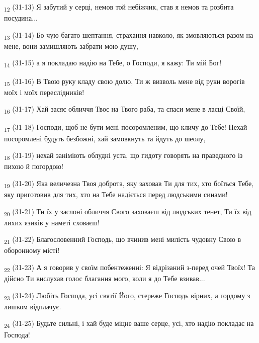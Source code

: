 \begin{tcolorbox}
\textsubscript{12} (31-13) Я забутий у серці, немов той небіжчик, став я немов та розбита посудина...
\end{tcolorbox}
\begin{tcolorbox}
\textsubscript{13} (31-14) Бо чую багато шептання, страхання навколо, як змовляються разом на мене, вони замишляють забрати мою душу,
\end{tcolorbox}
\begin{tcolorbox}
\textsubscript{14} (31-15) а я покладаю надію на Тебе, о Господи, я кажу: Ти мій Бог!
\end{tcolorbox}
\begin{tcolorbox}
\textsubscript{15} (31-16) В Твою руку кладу свою долю, Ти ж визволь мене від руки ворогів моїх і моїх переслідників!
\end{tcolorbox}
\begin{tcolorbox}
\textsubscript{16} (31-17) Хай засяє обличчя Твоє на Твого раба, та спаси мене в ласці Своїй,
\end{tcolorbox}
\begin{tcolorbox}
\textsubscript{17} (31-18) Господи, щоб не бути мені посоромленим, що кличу до Тебе! Нехай посоромлені будуть безбожні, хай замовкнуть та йдуть до шеолу,
\end{tcolorbox}
\begin{tcolorbox}
\textsubscript{18} (31-19) нехай заніміють облудні уста, що гидоту говорять на праведного із пихою й погордою!
\end{tcolorbox}
\begin{tcolorbox}
\textsubscript{19} (31-20) Яка величезна Твоя доброта, яку заховав Ти для тих, хто боїться Тебе, яку приготовив для тих, хто на Тебе надіється перед людськими синами!
\end{tcolorbox}
\begin{tcolorbox}
\textsubscript{20} (31-21) Ти їх у заслоні обличчя Свого заховаєш від людських тенет, Ти їх від лихих язиків у наметі сховаєш!
\end{tcolorbox}
\begin{tcolorbox}
\textsubscript{21} (31-22) Благословенний Господь, що вчинив мені милість чудовну Свою в оборонному місті!
\end{tcolorbox}
\begin{tcolorbox}
\textsubscript{22} (31-23) А я говорив у своїм побентеженні: Я відрізаний з-перед очей Твоїх! Та дійсно Ти вислухав голос благання мого, коли я до Тебе взивав...
\end{tcolorbox}
\begin{tcolorbox}
\textsubscript{23} (31-24) Любіть Господа, усі святії Його, стереже Господь вірних, а гордому з лишком відплачує.
\end{tcolorbox}
\begin{tcolorbox}
\textsubscript{24} (31-25) Будьте сильні, і хай буде міцне ваше серце, усі, хто надію покладає на Господа!
\end{tcolorbox}
